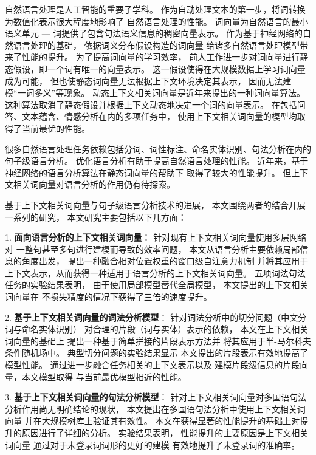\begin{cabstract}

自然语言处理是人工智能的重要子学科。
作为自动处理文本的第一步，将词转换为数值化表示很大程度地影响了
自然语言处理的性能。
词向量为自然语言的最小语义单元 --- 词提供了包含句法语义信息的稠密向量表示。
作为基于神经网络的自然语言处理的基础，
依据词义分布假设构造的词向量
给诸多自然语言处理模型带来了性能的提升。
为了提高词向量的学习效率，
前人工作进一步对词向量进行静态假设，即一个词有唯一的向量表示。
这一假设使得在大规模数据上学习词向量成为可能，
但也使静态词向量无法根据上下文环境决定其表示，
因而无法建模``一词多义''等现象。
动态上下文相关词向量是近年来提出的一种词向量算法。
这种算法取消了静态假设并根据上下文动态地决定一个词的向量表示。
在包括问答、文本蕴含、情感分析在内的多项任务中，
使用上下文相关词向量的模型均取得了当前最优的性能。

很多自然语言处理任务依赖包括分词、词性标注、命名实体识别、句法分析在内的
句子级语言分析。
优化语言分析有助于提高自然语言处理的性能。
近年来，基于神经网络的语言分析算法在静态词向量的帮助下
取得了较大的性能提升。
但上下文相关词向量对语言分析的作用仍有待探索。

基于上下文相关词向量与句子级语言分析技术的进展，
本文围绕两者的结合开展一系列的研究，
本文研究主要包括以下几方面：

1. \textbf{面向语言分析的上下文相关词向量}：
针对现有上下文相关词向量使用多层网络对
一整句甚至多句进行建模而导致的效率问题，
本文从语言分析主要依赖局部信息的角度出发，
提出一种融合相对位置权重的窗口级自注意力机制
并将其应用于上下文表示，从而获得一种适用于语言分析的上下文相关词向量。
五项词法句法任务的实验结果表明，
由于使用局部模型替代全局模型，
本文提出的上下文相关词向量在
不损失精度的情况下获得了三倍的速度提升。

2. \textbf{基于上下文相关词向量的词法分析模型}：
针对词法分析中的切分问题（中文分词与命名实体识别）
对合理的片段（词与实体）表示的依赖，
本文在上下文相关词向量的基础上
提出一种基于简单拼接的片段表示方法并
将其应用于半-马尔科夫条件随机场中。
典型切分问题的实验结果显示
本文提出的片段表示有效地提高了模型性能。
通过进一步融合任务相关的上下文表示以及
建模片段级信息的片段向量，本文模型取得
与当前最优模型相近的性能。

3. \textbf{基于上下文相关词向量的句法分析模型}：
针对上下文相关词向量对多国语句法分析作用尚无明确结论的现状，
本文提出在多国语句法分析中使用上下文相关词向量
并在大规模树库上验证其有效性。
本文在获得显著的性能提升的基础上对提升的原因进行了详细的分析。
实验结果表明，
性能提升的主要原因是上下文相关词向量
通过对于未登录词词形的更好的建模
有效地提升了未登录词的准确率。


\end{cabstract}
